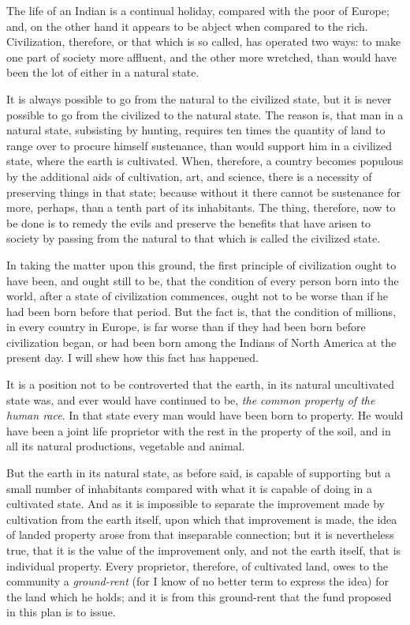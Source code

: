 The life of an Indian is a continual holiday, compared with the poor of Europe; and, on the other hand it appears to be abject when compared to the rich. Civilization, therefore, or that which is so called, has operated two ways: to make one part of society more affluent, and the other more wretched, than would have been the lot of either in a natural state.\par

It is always possible to go from the natural to the civilized state, but it is never possible to go from the civilized to the natural state. The reason is, that man in a natural state, subsisting by hunting, requires ten times the quantity of land to range over to procure himself sustenance, than would support him in a civilized state, where the earth is cultivated. When, therefore, a country becomes populous by the additional aids of cultivation, art, and science, there is a necessity of preserving things in that state; because without it there cannot be sustenance for more, perhaps, than a tenth part of its inhabitants. The thing, therefore, now to be done is to remedy the evils and preserve the benefits that have arisen to society by passing from the natural to that which is called the civilized state.\par

In taking the matter upon this ground, the first principle of civilization ought to have been, and ought still to be, that the condition of every person born into the world, after a state of civilization commences, ought not to be worse than if he had been born before that period. But the fact is, that the condition of millions, in every country in Europe, is far worse than if they had been born before civilization began, or had been born among the Indians of North America at the present day. I will shew how this fact has happened.\par

It is a position not to be controverted that the earth, in its natural uncultivated state was, and ever would have continued to be, \textit{the common property of the human race}. In that state every man would have been born to property. He would have been a joint life proprietor with the rest in the property of the soil, and in all its natural productions, vegetable and animal.\par

But the earth in its natural state, as before said, is capable of supporting but a small number of inhabitants compared with what it is capable of doing in a cultivated state. And as it is impossible to separate the improvement made by cultivation from the earth itself, upon which that improvement is made, the idea of landed property arose from that inseparable connection; but it is nevertheless true, that it is the value of the improvement only, and not the earth itself, that is individual property. Every proprietor, therefore, of cultivated land, owes to the community a \textit{ground-rent} (for I know of no better term to express the idea) for the land which he holds; and it is from this ground-rent that the fund proposed in this plan is to issue.\par

